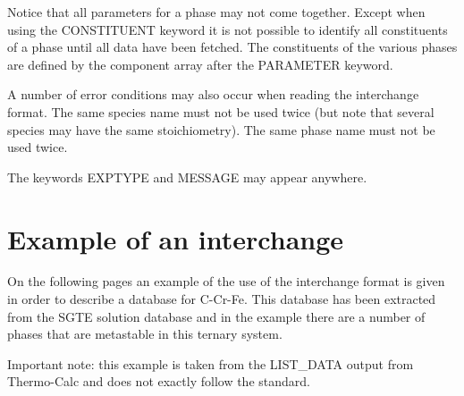 \documentclass[12pt]{article}
\begin{document}
Notice that all parameters for a phase may not come together. Except
when using the CONSTITUENT keyword it is not possible to identify all
constituents of a phase until all data have been fetched. The
constituents of the various phases are defined by the component array
after the PARAMETER keyword.

A number of error conditions may also occur when reading the interchange
format. The same species name must not be used twice (but note that
several species may have the same stoichiometry). The same phase name
must not be used twice.

The keywords EXPTYPE and MESSAGE may appear anywhere.

\section{Example of an interchange}

On the following pages an example of the use of the interchange format is
given in order to describe a database for C-Cr-Fe. This database has
been extracted from the SGTE solution database and in the example
there are a number of phases that are metastable in this ternary system.

Important note: this example is taken from the LIST\_DATA output from
Thermo-Calc and does not exactly follow the standard.
\end{document}
